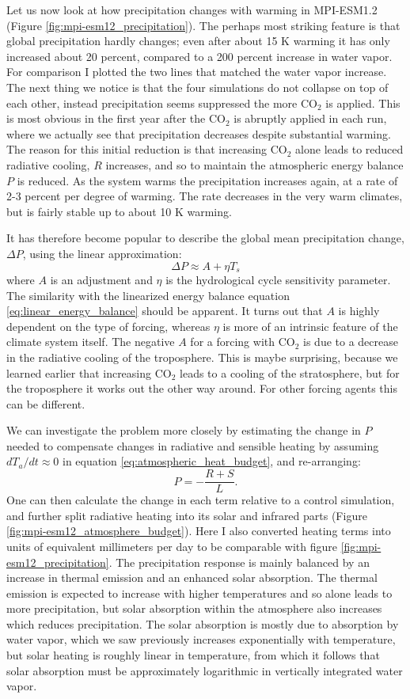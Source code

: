 \documentclass[12pt]{book}
\begin{document}
Let us now look at how precipitation changes with warming in MPI-ESM1.2 (Figure \ref{fig:mpi-esm12_precipitation}). The perhaps most striking feature is that global precipitation hardly changes; even after about 15 K warming it has only increased about 20 percent, compared to a 200 percent increase in water vapor. For comparison I plotted the two lines that matched the water vapor increase. The next thing we notice is that the four simulations do not collapse on top of each other, instead precipitation seems suppressed the more CO$_2$ is applied. This is most obvious in the first year after the CO$_2$ is abruptly applied in each run, where we actually see that precipitation decreases despite substantial warming. The reason for this initial reduction is that increasing CO$_2$ alone leads to reduced radiative cooling, $R$ increases, and so to maintain the atmospheric energy balance $P$ is reduced. As the system warms the precipitation increases again, at a rate of 2-3 percent per degree of warming. The rate decreases in the very warm climates, but is fairly stable up to about 10 K warming.

It has therefore become popular to describe the global mean precipitation change, $\Delta P$, using the linear approximation:
$$\Delta P \approx A +\eta T_s$$
where $A$ is an adjustment and $\eta$ is the hydrological cycle sensitivity parameter. The similarity with the linearized energy balance equation \ref{eq:linear_energy_balance} should be apparent. It turns out that $A$ is highly dependent on the type of forcing, whereas $\eta$ is more of an intrinsic feature of the climate system itself. The negative $A$ for a forcing with CO$_2$ is due to a decrease in the radiative cooling of the troposphere. This is maybe surprising, because we learned earlier that increasing CO$_2$ leads to a cooling of the stratosphere, but for the troposphere it works out the other way around. For other forcing agents this can be different.

We can investigate the problem more closely by estimating the change in $P$ needed to compensate changes in radiative and sensible heating by assuming $dT_a/dt \approx 0$ in equation \ref{eq:atmospheric_heat_budget}, and re-arranging:
$$ P = -\frac{R + S}{L}. $$
One can then calculate the change in each term relative to a control simulation, and further split radiative heating into its solar and infrared parts (Figure \ref{fig:mpi-esm12_atmosphere_budget}). Here I also converted heating terms into units of equivalent millimeters per day to be comparable with figure \ref{fig:mpi-esm12_precipitation}. 
The precipitation response is mainly balanced by an increase in thermal emission and an enhanced solar absorption. The thermal emission is expected to increase with higher temperatures and so alone leads to more precipitation, but solar absorption within the atmosphere also increases which reduces precipitation. The solar absorption is mostly due to absorption by water vapor, which we saw previously increases exponentially with temperature, but solar heating is roughly linear in temperature, from which it follows that solar absorption must be approximately logarithmic in vertically integrated water vapor. 
\end{document}
